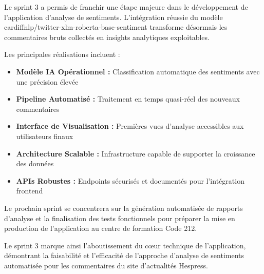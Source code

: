 Le sprint 3 a permis de franchir une étape majeure dans le développement de l'application d'analyse de sentiments. L'intégration réussie du modèle cardiffnlp/twitter-xlm-roberta-base-sentiment transforme désormais les commentaires bruts collectés en insights analytiques exploitables.

Les principales réalisations incluent :

\begin{itemize}
    \item \textbf{Modèle IA Opérationnel :} Classification automatique des sentiments avec une précision élevée
    \item \textbf{Pipeline Automatisé :} Traitement en temps quasi-réel des nouveaux commentaires
    \item \textbf{Interface de Visualisation :} Premières vues d'analyse accessibles aux utilisateurs finaux
    \item \textbf{Architecture Scalable :} Infrastructure capable de supporter la croissance des données
    \item \textbf{APIs Robustes :} Endpoints sécurisés et documentés pour l'intégration frontend
\end{itemize}

Le prochain sprint se concentrera sur la génération automatisée de rapports d'analyse et la finalisation des tests fonctionnels pour préparer la mise en production de l'application au centre de formation Code 212.

Le sprint 3 marque ainsi l'aboutissement du cœur technique de l'application, démontrant la faisabilité et l'efficacité de l'approche d'analyse de sentiments automatisée pour les commentaires du site d'actualités Hespress.